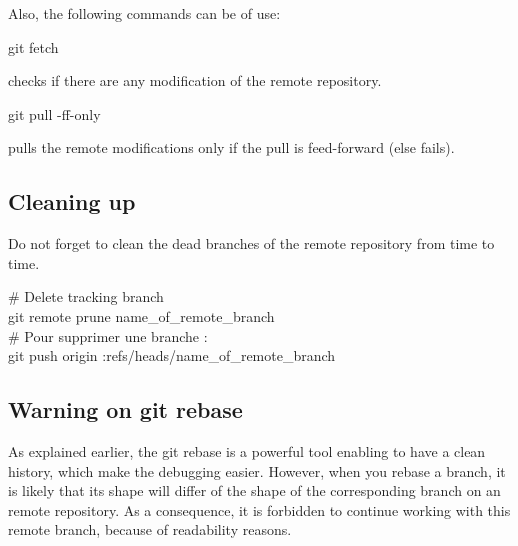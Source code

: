 Also, the following commands can be of use:
\begin{tt}git fetch \end{tt} checks if there are any modification of the remote repository.\\
\begin{tt}git pull -ff-only \end{tt} pulls the remote modifications only if the pull is feed-forward (else fails).\\




\subsection{Cleaning up}

Do not forget to clean the dead branches of the remote repository from time to time.
\begin{tt}
\# Delete tracking branch\\
git remote prune name\_of\_remote\_branch\\
\# Pour supprimer une branche :\\
git push origin :refs/heads/name\_of\_remote\_branch
\end{tt}



\subsection{Warning on git rebase}
\label{section:rebase-warning}

As explained earlier, the git rebase is a powerful tool enabling to have a clean history, which make the debugging easier. 
However, when you rebase a branch, it is likely that its shape will differ of the shape of the corresponding branch on an remote repository. 
As a consequence, it is forbidden to continue working with this remote branch, because of readability reasons.\\



